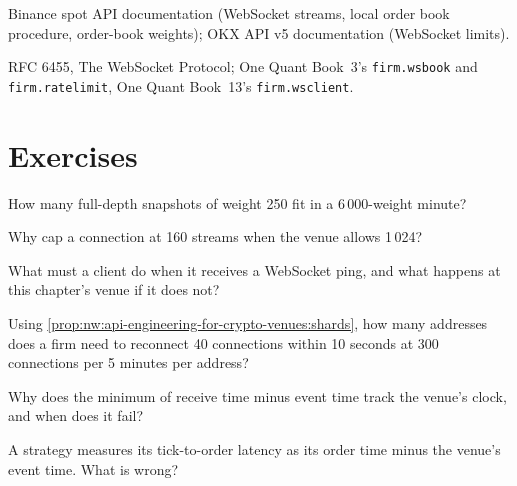 \begin{omsources}
\item Binance spot API documentation (WebSocket streams, local order book procedure, order-book weights); OKX API v5 documentation (WebSocket limits).
\item RFC 6455, The WebSocket Protocol; One Quant Book~3's \texttt{firm.wsbook} and \texttt{firm.ratelimit}, One Quant Book~13's \texttt{firm.wsclient}.
\end{omsources}

\section{Exercises}

\begin{exercise}[$\star$]\label{exo:nw:api-engineering-for-crypto-venues:1}
How many full-depth snapshots of weight 250 fit in a 6\,000-weight minute?
\end{exercise}

\begin{exercise}[$\star$]\label{exo:nw:api-engineering-for-crypto-venues:2}
Why cap a connection at 160 streams when the venue allows 1\,024?
\end{exercise}

\begin{exercise}[$\star$]\label{exo:nw:api-engineering-for-crypto-venues:3}
What must a client do when it receives a WebSocket ping, and what happens at this chapter's venue if it does not?
\end{exercise}

\begin{exercise}[$\star\star$]\label{exo:nw:api-engineering-for-crypto-venues:4}
Using \cref{prop:nw:api-engineering-for-crypto-venues:shards}, how many addresses does a firm need to reconnect 40 connections within 10 seconds at 300
connections per 5 minutes per address?
\end{exercise}

\begin{exercise}[$\star\star$]\label{exo:nw:api-engineering-for-crypto-venues:5}
Why does the minimum of receive time minus event time track the venue's clock, and when does it fail?
\end{exercise}

\begin{exercise}[$\star\star$]\label{exo:nw:api-engineering-for-crypto-venues:6}
A strategy measures its tick-to-order latency as its order time minus the venue's event time. What is wrong?
\end{exercise}

